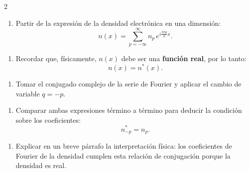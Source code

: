 \documentclass{article}
\begin{document}
\setlength{\columnsep}{2cm}
\begin{multicols}{2} 

\begin{enumerate}[label={{\textcolor{trueblue}{\textbf{Ej}. \arabic*.0}}}, start=1]
    \item Partir de la expresión de la densidad electrónica en una dimensión:
    \[
    n(x) = \sum_{p=-\infty}^{\infty} n_p \, e^{i \tfrac{2\pi p}{a} x}.
    \]
\end{enumerate}

\begin{enumerate}[label={{\textcolor{trueblue}{\textbf{Ej}. \arabic*.0}}}, start=2]
    \item Recordar que, físicamente, $n(x)$ debe ser una \textbf{función real}, por lo tanto:
    \[
    n(x) = n^*(x).
    \]
\end{enumerate}  

\begin{enumerate}[label={{\textcolor{trueblue}{\textbf{Ej}. \arabic*.0}}}, start=3]
    \item Tomar el conjugado complejo de la serie de Fourier y aplicar el cambio de variable $q=-p$.
\end{enumerate} 

\begin{enumerate}[label={{\textcolor{trueblue}{\textbf{Ej}. \arabic*.0}}}, start=4]
    \item Comparar ambas expresiones término a término para deducir la condición sobre los coeficientes:
    \[
    n_{-p}^* = n_p.
    \]
\end{enumerate} 

\begin{enumerate}[label={{\textcolor{trueblue}{\textbf{Ej}. \arabic*.0}}}, start=5]
    \item Explicar en un breve párrafo la interpretación física: los coeficientes de Fourier de la densidad cumplen esta relación de conjugación porque la densidad es real.
\end{enumerate} 

\end{multicols}


\tableofcontents \newpage

\begin{center}
\end{center}  \vspace{2cm}
\end{document}
